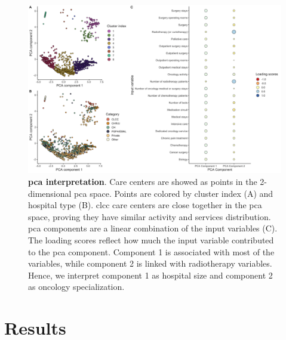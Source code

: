 \begin{figure}[H]
    \includegraphics[width=\textwidth]{images/camion/supplemental/sup_fig1_pca_and_clustering.png}
    \centering
    \caption{
        \textbf{\ac{pca} interpretation}. Care centers are showed as points in the 2-dimensional \ac{pca} space. Points are colored by cluster index (A) and hospital type (B). \ac{clcc} care centers are close together in the \ac{pca} space, proving they have similar activity and services distribution. \ac{pca} components are a linear combination of the input variables (C). The loading scores reflect how much the input variable contributed to the \ac{pca} component. Component 1 is associated with most of the variables, while component 2 is linked with radiotherapy variables. Hence, we interpret component 1 as hospital size and component 2 as oncology specialization.
    }
    \label{fig:clustering-pca}
\end{figure}

\section{Results}

